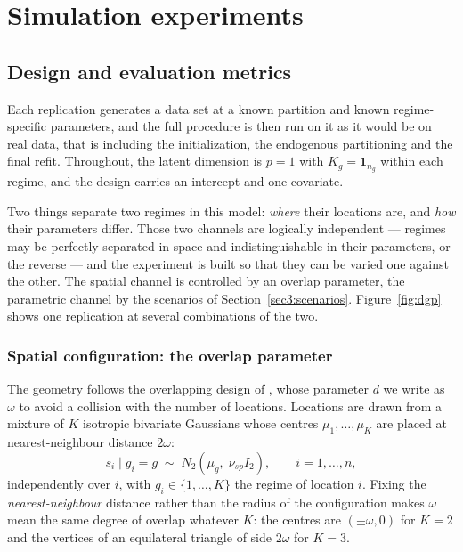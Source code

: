 \section{Simulation experiments}\label{sec3}

\subsection{Design and evaluation metrics}\label{sec3:design}

Each replication generates a data set at a known partition and known regime-specific parameters, and the full procedure is then run on it as it would be on real data, that is including the initialization, the endogenous partitioning and the final refit. Throughout, the latent dimension is $p=1$ with $K_g = \mathbf{1}_{n_g}$ within each regime, and the design carries an intercept and one covariate.

Two things separate two regimes in this model: \emph{where} their locations are, and \emph{how} their parameters differ. Those two channels are logically independent --- regimes may be perfectly separated in space and indistinguishable in their parameters, or the reverse --- and the experiment is built so that they can be varied one against the other. The spatial channel is controlled by an overlap parameter, the parametric channel by the scenarios of Section~\ref{sec3:scenarios}. Figure~\ref{fig:dgp} shows one replication at several combinations of the two.

\subsubsection{Spatial configuration: the overlap parameter}\label{sec3:overlap}

The geometry follows the overlapping design of \citet{MorelliMaranzanoOtto2026}, whose parameter $d$ we write as $\omega$ to avoid a collision with the number of locations. Locations are drawn from a mixture of $K$ isotropic bivariate Gaussians whose centres $\mu_1,\dots,\mu_K$ are placed at nearest-neighbour distance $2\omega$:
\begin{equation}
  s_i \mid g_i = g \;\sim\; N_2\!\left(\mu_g,\; \nu_{sp} I_2\right),
  \qquad i = 1,\dots,n ,
  \label{eq:dgpcoords}
\end{equation}
independently over $i$, with $g_i \in \{1,\dots,K\}$ the regime of location $i$. Fixing the \emph{nearest-neighbour} distance rather than the radius of the configuration makes $\omega$ mean the same degree of overlap whatever $K$: the centres are $(\pm\omega,0)$ for $K=2$ and the vertices of an equilateral triangle of side $2\omega$ for $K=3$.

